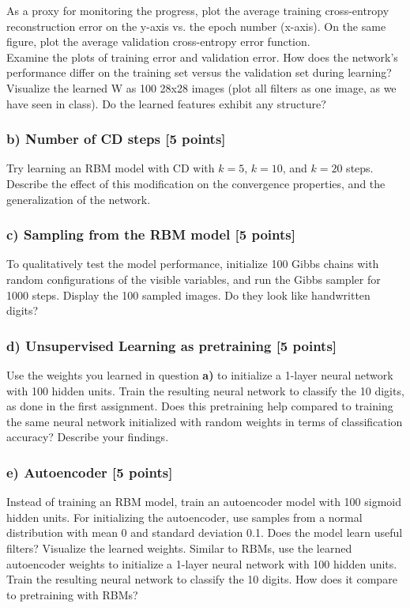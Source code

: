 \documentclass[10pt]{article}
\begin{document}
As a proxy for monitoring the progress, 
plot the average training cross-entropy reconstruction error
on the y-axis vs. the epoch number (x-axis). 
On the same figure, plot the average validation cross-entropy error function.
\\
 
Examine the plots of training error and validation error.
How does the network's performance differ on the training set versus the validation set
during learning? 
Visualize the learned W as 100 28x28 images
(plot all filters as one image, as we have seen in class).
Do the learned features exhibit any structure? 

\subsubsection*{b) Number of CD steps [5 points]}
Try learning an RBM model with CD with $k = 5$, $k = 10$, and $k = 20$ steps.
Describe the effect of this modification on the convergence properties, and the
generalization of the network.


\subsubsection*{c) Sampling from the RBM model [5 points]}
To qualitatively test the model performance, initialize 100 Gibbs chains 
with random configurations of the visible variables, and run the Gibbs sampler 
for 1000 steps. Display the 100 sampled images. Do they look like handwritten digits?

\subsubsection*{d) Unsupervised Learning as pretraining [5 points]}
Use the weights you learned in question \textbf{a)} to initialize a 1-layer neural network with 100 hidden units. 
Train the resulting neural network to classify the 10 digits, as done in the first 
assignment. Does this pretraining help compared to training the same 
neural network initialized with random weights in terms of 
classification accuracy? Describe your findings.  

\subsubsection*{e) Autoencoder [5 points]}
Instead of training an RBM model, train an autoencoder model
with 100 sigmoid hidden units. For initializing the autoencoder, use samples from a normal distribution with mean 0 and standard deviation 0.1. 
Does the model learn useful filters? Visualize the learned weights.
Similar to RBMs, use the learned autoencoder 
weights to initialize a 1-layer neural network with 100 hidden units. 
Train the resulting neural network to classify the 10 digits.
How does it compare to pretraining with RBMs?
 
\end{document}
